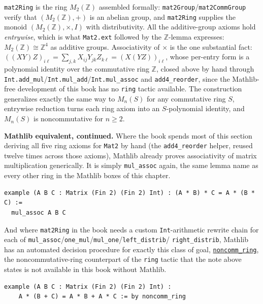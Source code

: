 \begin{mathreading}

\texttt{mat2Ring} is the ring \(M_2(\mathbb{Z})\) assembled formally: \texttt{mat2Group}/\texttt{mat2CommGroup} verify that \((M_2(\mathbb{Z}), +)\) is an abelian group, and \texttt{mat2Ring} supplies the monoid \((M_2(\mathbb{Z}),
\times, I)\) with distributivity. All the additive-group axioms hold \emph{entrywise}, which is what \texttt{Mat2.ext} followed by the \(\mathbb{Z}\)-lemma expresses: \(M_2(\mathbb{Z}) \cong \mathbb{Z}^4\) as additive groups. Associativity of \(\times\) is the one substantial fact: \(((XY)Z)_{i\ell} = \sum_{j,k} X_{ij}Y_{jk}Z_{k\ell}
= (X(YZ))_{i\ell}\), whose per-entry form is a polynomial identity over the commutative ring \(\mathbb{Z}\), closed above by hand through \texttt{Int.add\_\allowbreak{}mul}/\texttt{Int.mul\_\allowbreak{}add}/\texttt{Int.mul\_\allowbreak{}assoc} and \texttt{add4\_\allowbreak{}reorder}, since the Mathlib-free development of this book has no \texttt{ring} tactic available. The construction generalizes exactly the same way to \(M_n(S)\) for any commutative ring \(S\), entrywise reduction turns each ring axiom into an \(S\)-polynomial identity, and \(M_n(S)\) is noncommutative for \(n \ge 2\).

\end{mathreading}

\textbf{Mathlib equivalent, continued.} Where the book spends most of this section deriving all five ring axioms for \texttt{Mat2} by hand (the \texttt{add4\_\allowbreak{}reorder} helper, reused twelve times across those axioms), Mathlib already proves associativity of matrix multiplication generically. It is simply \texttt{mul\_\allowbreak{}assoc} again, the same lemma name as every other ring in the Mathlib boxes of this chapter.

\begin{lstlisting}
example (A B C : Matrix (Fin 2) (Fin 2) Int) : (A * B) * C = A * (B * C) :=
  mul_assoc A B C
\end{lstlisting}

And where \texttt{mat2Ring} in the book needs a custom \texttt{Int}-arithmetic rewrite chain for each of \texttt{mul\_\allowbreak{}assoc}/\texttt{one\_\allowbreak{}mul}/\texttt{mul\_\allowbreak{}one}/\texttt{left\_\allowbreak{}distrib}/ \texttt{right\_\allowbreak{}distrib}, Mathlib has an automated decision procedure for exactly this class of goal, \href{https://lean-lang.org/doc/reference/latest/Tactic-Proofs/Tactic-Reference/}{\texttt{noncomm\_\allowbreak{}ring}}, the noncommutative-ring counterpart of the \texttt{ring} tactic that the note above states is not available in this book without Mathlib.

\begin{lstlisting}
example (A B C : Matrix (Fin 2) (Fin 2) Int) :
    A * (B + C) = A * B + A * C := by noncomm_ring
\end{lstlisting}

